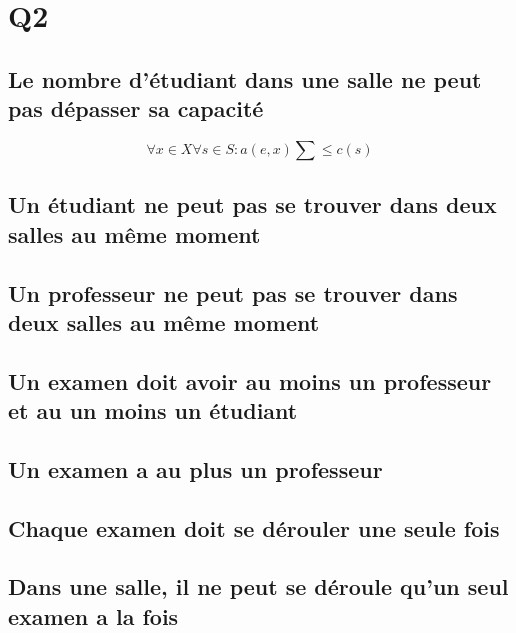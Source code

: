 \documentclass[a4paper,10pt]{article}
\begin{document}
\section{Q2}
\subsection {Le nombre d'étudiant dans une salle ne peut pas dépasser sa capacité}
\begin{displaymath}
\forall x \in X \forall s \in S : a(e,x)  \sum \leqslant c(s)
\end{displaymath}	

\subsection {Un étudiant ne peut pas se trouver dans deux salles au même moment}

\subsection {Un professeur ne peut pas se trouver dans deux salles au même moment}

\subsection {Un examen doit avoir au moins un professeur et au un moins un étudiant}

\subsection {Un examen a au plus un professeur}

\subsection {Chaque examen doit se dérouler une seule fois}

\subsection {Dans une salle, il ne peut se déroule qu'un seul examen a la fois}
\end{document}

